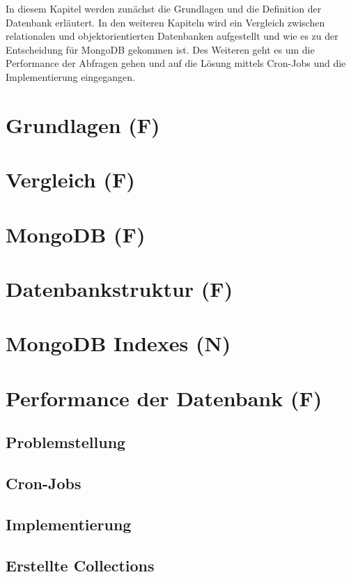 In diesem Kapitel werden zunächst die Grundlagen und die Definition der Datenbank erläutert. In den weiteren Kapiteln wird ein Vergleich zwischen relationalen und objektorientierten Datenbanken aufgestellt und wie es zu der Entscheidung für MongoDB gekommen ist. Des Weiteren geht es um die Performance der Abfragen gehen und auf die Lösung mittels Cron-Jobs und die Implementierung eingegangen.

\section{Grundlagen (F)}


\section{Vergleich (F)}


\section{MongoDB (F)}


\section{Datenbankstruktur (F)}


\section{MongoDB Indexes (N)}

\newpage
\section{Performance der Datenbank (F)}


\subsection{Problemstellung}


\subsection{Cron-Jobs}


\subsection{Implementierung}


\subsection{Erstellte Collections}
